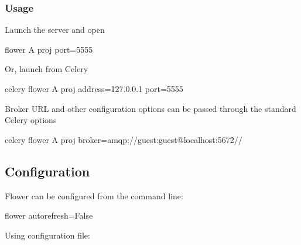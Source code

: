 \documentclass[letterpaper,10pt,english]{sphinxmanual}
\begin{document}
\subsubsection{Usage}
\label{\detokenize{install:usage}}
Launch the server and open 

\begin{sphinxVerbatim}[commandchars=\\\{\}]
\PYGZdl{} flower \PYGZhy{}A proj \PYGZhy{}\PYGZhy{}port=5555
\end{sphinxVerbatim}

Or, launch from Celery

\begin{sphinxVerbatim}[commandchars=\\\{\}]
\PYGZdl{} celery flower \PYGZhy{}A proj \PYGZhy{}\PYGZhy{}address=127.0.0.1 \PYGZhy{}\PYGZhy{}port=5555
\end{sphinxVerbatim}

Broker URL and other configuration options can be passed through the standard Celery options

\begin{sphinxVerbatim}[commandchars=\\\{\}]
\PYGZdl{} celery flower \PYGZhy{}A proj \PYGZhy{}\PYGZhy{}broker=amqp://guest:guest@localhost:5672//
\end{sphinxVerbatim}


\subsection{Configuration}
\label{\detokenize{config:configuration}}\label{\detokenize{config::doc}}
Flower can be configured from the command line:

\begin{sphinxVerbatim}[commandchars=\\\{\}]
\PYGZdl{} flower \PYGZhy{}\PYGZhy{}auto\PYGZus{}refresh=False
\end{sphinxVerbatim}

Using  configuration file:

\begin{sphinxVerbatim}[commandchars=\\\{\}]
  

  
\end{sphinxVerbatim}
\end{document}
